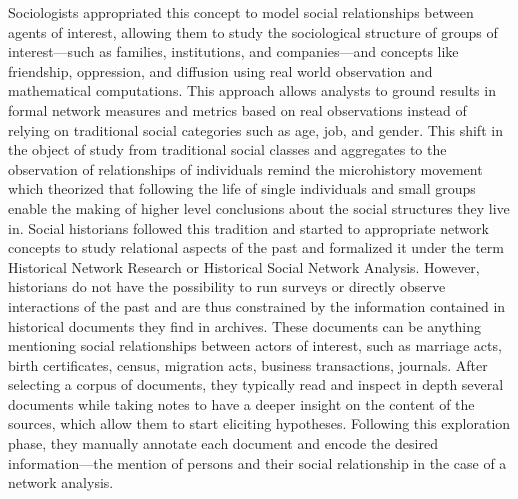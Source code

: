 Sociologists appropriated this concept to model social relationships between agents of interest, allowing them to study the sociological structure of groups of interest---such as families, institutions, and companies---and concepts like friendship, oppression, and diffusion using real world observation and mathematical computations.
This \sna approach allows analysts to ground results in formal network measures and metrics based on real observations instead of relying on traditional social categories such as age, job, and gender\cite{freemanDevelopmentSocialNetwork2004}.
This shift in the object of study from traditional social classes and aggregates to the observation of relationships of individuals remind the microhistory movement\cite{ginzburgMicrohistoire1981} which theorized that following the life of single individuals and small groups enable the making of higher level conclusions about the social structures they live in.
Social historians followed this tradition and started to appropriate network concepts to study relational aspects of the past and formalized it under the term Historical Network Research or Historical Social Network Analysis\cite{wetherellHistoricalSocialNetwork1998}.
However, historians do not have the possibility to run surveys or directly observe interactions of the past and are thus constrained by the information contained in historical documents they find in archives.
These documents can be anything mentioning social relationships between actors of interest, such as marriage acts, birth certificates, census, migration acts, business transactions, journals.
After selecting a corpus of documents, they typically read and inspect in depth several documents while taking notes to have a deeper insight on the content of the sources, which allow them to start eliciting hypotheses.
Following this exploration phase, they manually annotate each document and encode the desired information---the mention of persons and their social relationship in the case of a network analysis.

